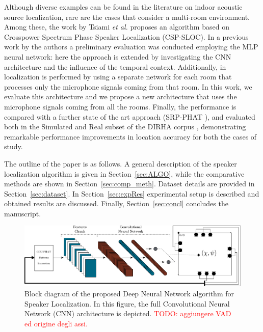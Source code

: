\documentclass[review]{elsarticle}
\newcommand{\secref}[1]{Section~\ref{#1}}
\begin{document}
Although diverse examples can be found in the literature on indoor acoustic source localization, rare are the cases that consider a multi-room environment. Among these, the work by Tsiami \textit{et al.} \cite{tsiami2014experiments} proposes an algorithm based on Crosspower Spectrum Phase Speaker Localization (CSP-SLOC). 
In a previous work by the authors \cite{vesperini2016sloc} a preliminary evaluation was conducted employing the MLP neural network: here the approach is extended by investigating the CNN architecture and the influence of the temporal context. Additionally, in \cite{vesperini2016sloc} localization is performed by using a separate network for each room that processes only the microphone signals coming from that room. In this work, we evaluate this architecture and we propose a new architecture that uses the microphone signals coming from all the rooms. Finally, the performance is compared with a further state of the art approach (SRP-PHAT \cite{DoSY07}), and evaluated both in the Simulated and Real subset of the DIRHA corpus \cite{cristoforetti2014dirha}, demonstrating remarkable performance improvements in location accuracy for both the cases of study.


The outline of the paper is as follows. A general description of the speaker localization algorithm is given in  \secref{sec:ALGO}, while the comparative methods are shown in \secref{sec:comp_meth}. Dataset details are provided in \secref{sec:dataset}. In \secref{sec:expRes} experimental setup is described and obtained results are discussed.
Finally, \secref{sec:concl} concludes the manuscript.

\begin{figure}[t]
	\centering
	\includegraphics[width=\textwidth]{imgs/alg_2_2}
	\caption{Block diagram of the proposed Deep Neural Network algorithm for Speaker Localization. 	In this figure, the full Convolutional Neural Network (CNN) architecture is depicted. \textcolor{red}{TODO: aggiungere VAD ed origine degli assi.}}
	\label{fig:proposed_method}
\end{figure}
\end{document}
